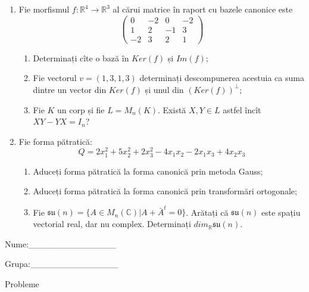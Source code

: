 \documentclass{article}
\begin{document}
\begin{enumerate}
 \item Fie morfismul $f:\mathbb{R}^4 \to \mathbb{R}^3$ al cărui matrice în raport cu bazele canonice este
$$\begin{pmatrix}
0&-2&0&-2\\
1&2&-1&3\\
-2&3&2&1
\end{pmatrix}$$

\begin{enumerate}
\item Determinați cîte o bază în $Ker(f)$ și $Im(f)$;
\item Fie vectorul $v=(1,3,1,3)$ determinați descompunerea acestuia ca suma dintre un vector din $Ker(f)$ și unul din $(Ker(f))^\perp$;
\item Fie $K$ un corp și fie $L=M_n(K)$. Există $X,Y \in L$ astfel încît $XY-YX=I_n$?  
\end{enumerate}
\item Fie forma pătratică:
$$Q= 2x_1^2+5x_2^2+2x_3^2-4x_1x_2-2x_1x_3+4x_2x_3$$

\begin{enumerate}
\item Aduceți forma pătratică la forma canonică prin metoda Gauss;
\item Aduceți forma pătratică la forma canonică prin transformări ortogonale;
\item Fie $\mathfrak{su}(n)=\{ A \in M_n(\mathbb{C}) | A+\bar{A}^t=0\}$. Arătați că $\mathfrak{su}(n)$ este spațiu vectorial real, dar nu complex.
Determinați $dim_{\mathbb{R}}\mathfrak{su}(n)$.
\end{enumerate}
\end{enumerate}
\newpage
\begin{flushright}
Nume:\_\_\_\_\_\_\_\_\_\_\_\_\_\_
 
 
Grupa:\_\_\_\_\_\_\_\_\_\_\_\_\_\_
\end{flushright}
\begin{center}
\vspace{2cm}
{\Large Probleme}
\vspace{2cm}
\end{center}
\end{document}

